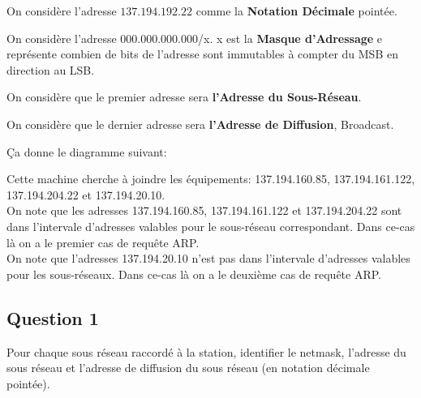 \documentclass{article}
\begin{document}
\begin{remark}
    On considère l'adresse $137.194.192.22$ comme la \textbf{Notation Décimale} pointée.
\end{remark}
\begin{remark}
    On considère l'adresse $000.000.000.000$/x. x est la \textbf{Masque d'Adressage} e représente combien de bits de l'adresse sont immutables à compter du MSB en direction au LSB.
\end{remark}
\begin{remark}
    On considère que le premier adresse sera \textbf{l'Adresse du Sous-Réseau}.
\end{remark}
\begin{remark}
    On considère que le dernier adresse sera \textbf{l'Adresse de Diffusion}, Broadcast.
\end{remark}

Ça donne le diagramme suivant:
\begin{figure}[H]
    \centering{}
\end{figure}

Cette machine cherche à joindre les équipements: 137.194.160.85, 137.194.161.122, 137.194.204.22 et 137.194.20.10.\\

On note que les adresses 137.194.160.85, 137.194.161.122 et 137.194.204.22 sont dans l'intervale d'adresses valables pour le sous-réseau correspondant. Dans ce-cas là on a le premier cas de requête ARP.\\

On note que l'adresses 137.194.20.10 n'est pas dans l'intervale d'adresses valables pour les sous-réseaux. Dans ce-cas là on a le deuxième cas de requête ARP.

\subsection*{Question 1}
\begin{exercise}
    Pour chaque sous réseau raccordé à la station, identifier le netmask, l'adresse du sous réseau et l'adresse de diffusion du sous réseau (en notation décimale pointée).
\end{exercise}
\begin{resolution}

\end{resolution}
\end{document}
